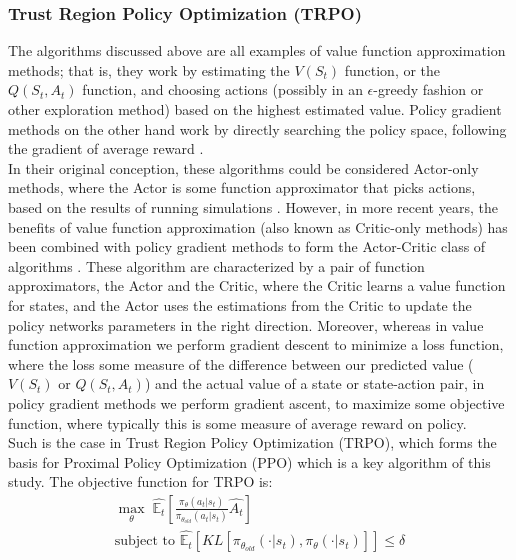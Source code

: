 \documentclass[12pt]{article}
\begin{document}
\subsubsection{Trust Region Policy Optimization (TRPO)}\label{trpo}
The algorithms discussed above are all examples of value function approximation methods; that is, they work by estimating the $V(S_t)$ function, or the $Q(S_t,A_t)$ function, and choosing actions (possibly in an $\epsilon$-greedy fashion or other exploration method) based on the highest estimated value. Policy gradient methods on the other hand work by directly searching the policy space, following the gradient of average reward \autocite{article}.\\\newline
In their original conception, these algorithms could be considered Actor-only methods, where the Actor is some function approximator that picks actions, based on the results of running simulations \autocite{NIPS1994_1c1d4df5,905687}. However, in more recent years, the benefits of value function approximation (also known as Critic-only methods) has been combined with policy gradient methods to form the Actor-Critic class of algorithms \autocite{NIPS1999_6449f44a}. These algorithm are characterized by a pair of function approximators, the Actor and the Critic, where the Critic learns a value function for states, and the Actor uses the estimations from the Critic to update the policy networks parameters in the right direction. Moreover, whereas in value function approximation we perform gradient descent to minimize a loss function, where the loss some measure of the difference between our predicted value ($V(S_t)$ or $Q(S_t,A_t)$) and the actual value of a state or state-action pair, in policy gradient methods we perform gradient ascent, to maximize some objective function, where typically this is some measure of average reward on policy. \\\newline
Such is the case in Trust Region Policy Optimization (TRPO), which forms the basis for Proximal Policy Optimization (PPO) \autocite{schulman2017proximal} which is a key algorithm of this study. The objective function for TRPO is:
\begin{gather}
        \max_\theta\; \hat{\mathbb{E}_t}\left[\frac{\pi_\theta(a_t | s_t)}{\pi_{\theta_{old}}(a_t | s_t)}\hat{A_t}\right]\\
    \text{subject to } \hat{\mathbb{E}_t}\left[KL\left[\pi_{\theta_{old}}(\cdot | s_t),\pi_\theta(\cdot|s_t)\right]\right] \leq \delta
\end{gather}
\end{document}
